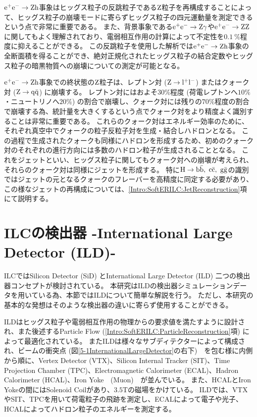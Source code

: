 $\rm e^+e^- \to Zh$事象はヒッグス粒子の反跳粒子である$\rm Z$粒子を再構成することによって、ヒッグス粒子の崩壊モードに寄らずヒッグス粒子の四元運動量を測定できるという点で非常に重要である。
また、背景事象である$\rm e^+e^- \to Z\gamma$や$\rm e^+e^- \to ZZ$に関してもよく理解されており、電弱相互作用の計算によって不定性を$0.1\ \%$程度に抑えることができる\cite{GlobalProject}。
この反跳粒子を使用した解析では$\rm e^+e^- \to Zh$事象の全断面積を得ることができ、絶対正規化されたヒッグス粒子の結合定数やヒッグス粒子の暗黒物質への崩壊についての測定が可能となる。

$\rm e^+e^- \to Zh$事象での終状態の$\rm Z$粒子は、レプトン対 ($\rm Z \to l^+l^-$) またはクォーク対 ($\rm Z \to q\bar{q}$) に崩壊する。
レプトン対にはおよそ$30\%$程度 (荷電レプトンへ$10\%$・ニュートリノへ$20\%$) の割合で崩壊し、クォーク対には残りの$70\%$程度の割合で崩壊する為、統計量を大きくするという点でクォーク対をより精度よく識別することは非常に重要である。
これらのクォーク対はエネルギー効率のために、それぞれ真空中でクォークの粒子反粒子対を生成・結合しハドロンとなる。
この過程で生成されたクォークも同様にハドロンを形成するため、初めのクォーク対のそれぞれの進行方向には多数のハドロン粒子が生成されることとなる。
これをジェットといい、ヒッグス粒子に関してもクォーク対への崩壊が考えられ、それらのクォーク対は同様にジェットを形成する。
特に$\rm H \to b \bar{b},\ c \bar{c},\ g \bar{g}$の識別ではジェットの元となるクォークのフレーバーを高精度に同定する必要があり、この様なジェットの再構成については、\ref{Intro:SoftERILC:JetReconstruction}項にて説明する。


\section{ILCの検出器 -International Large Detector (ILD)-} \label{Intro:InternationalLargeDetector}

ILCではSilicon Detector (SiD) とInternational Large Detector (ILD) 二つの検出器コンセプトが検討されている。
本研究はILDの検出器シミュレーションデータを用いている為、本節ではILDについて簡単な解説を行う。
ただし、本研究の基本的な発想はそのような検出器の違いに寄らず使用することができる。

ILDはヒッグス粒子や電弱相互作用の物理からの要求値を満たすように設計され、また後述するParticle Flow (\ref{Intro:SoftERILC:ParticleReconstruction}項) によって最適化されている。
またILDは様々なサブディテクターによって構成され、ビームの衝突点 (図\ref{5-1InternationalLargeDetector}の右下)　を包む様に内側から順に、Vertex Detector (VTX)、Silicon Internal Tracker (SIT)、Time Projection Chamber (TPC)、Electromagnetic Calorimeter (ECAL)、Hadron Calorimeter (HCAL)、Iron Yoke　(Muon)　が並んでいる。
また、HCALとIron Yokeの間にはSolenoid Coilがあり、$3.5 \mathrm{T}$の磁場をかけている。
ILDでは、VTXやSIT、TPCを用いて荷電粒子の飛跡を測定し、ECALによって電子や光子、HCALによってハドロン粒子のエネルギーを測定する。

